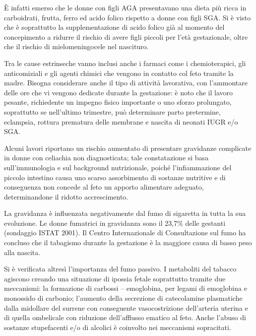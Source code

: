\`E infatti emerso che le donne con figli AGA presentavano una dieta più ricca in carboidrati,
frutta, ferro ed acido folico rispetto a donne con figli SGA. Si è visto che è soprattutto la
supplementazione di acido folico già al momento del concepimento a ridurre il rischio di 
avere figli piccoli per l'età gestazionale, oltre che il rischio di mielomeningocele nel nascituro.\cite{sga-26}


Tra le cause estrinseche vanno inclusi anche i farmaci come i chemioterapici, gli anticomiziali
e gli agenti chimici che vengono in contatto col feto tramite la madre.
Bisogna considerare anche il tipo di attivit\`a lavorativa, con l'ammontare delle ore
che vi vengono dedicate durante la gestazione: \`e noto che il lavoro pesante, 
richiedente un impegno fisico importante o uno sforzo prolungato, soprattutto se nell'ultimo trimestre,
può determinare parto pretermine, eclampsia, rottura prematura delle membrane e nascita di 
neonati IUGR e/o SGA\cite{sga-14}.


Alcuni lavori riportano un rischio aumentato di presentare gravidanze complicate
in donne con celiachia non diagnosticata; tale constatazione si basa sull'immunologia e 
sul background nutrizionale, poich\'e l'infiammazione del piccolo intestino causa uno
scarso assorbimento di sostanze nutritive e di conseguenza non concede al feto un apporto alimentare adeguato,
determinandone il ridotto accrescimento\cite{sga-15}.


La gravidanza \`e influenzata negativamente dal fumo di sigaretta in tutta la sua evoluzione.
Le donne fumatrici in gravidanza sono il 23,7\% delle gestanti (sondaggio ISTAT 2001).
Il Centro Internazionale di Consultazione sul fumo ha concluso che il tabagismo durante la gestazione
\`e la maggiore causa di basso peso alla nascita\cite{sga-18}.


Si \`e verificata altres\`i l'importanza del fumo passivo. I metaboliti del tabacco agiscono creando
una situazione di ipossia fetale soprattutto tramite due meccanismi: la formazione di carbossi -- emoglobina, 
per legami di emoglobina e monossido di carbonio; l'aumento della secrezione di catecolamine plasmatiche
dalla midollare del surrene con conseguente vasocostrizione dell'arteria uterina e di quella ombelicale
con riduzione dell'afflusso ematico al feto\cite{sga-20}.
Anche l'abuso di sostanze stupefacenti e/o di alcolici è coinvolto nei meccanismi sopracitati\cite{sga-24}\cite{sga-25}.


